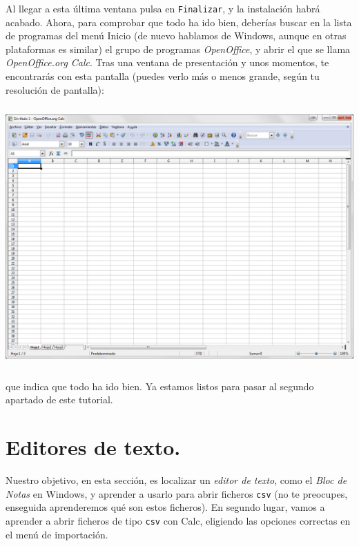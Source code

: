 \documentclass[10pt,a4paper]{article}\usepackage[]{graphicx}\usepackage[]{color}
\newcounter {cont01}
\begin{document}
Al llegar a esta última ventana pulsa en {\tt Finalizar}, y la instalación habrá acabado. Ahora,
para comprobar que todo ha ido bien, deberías buscar en la lista de programas del menú Inicio (de
nuevo hablamos de Windows, aunque en otras plataformas es similar) el grupo de programas {\em
OpenOffice}, y abrir el que se llama {\em OpenOffice.org Calc}. Tras una ventana de presentación y
unos momentos, te encontrarás con esta pantalla (puedes verlo más o menos grande, según tu
resolución de pantalla):
    \begin{center}
    \includegraphics[height=10cm]{../fig/Tut00-WebOpenOffice-10.png}
    \end{center}
que indica que todo ha ido bien. Ya estamos listos para pasar al segundo apartado de este tutorial.

\section{Editores de texto.}
\label{tut01:sec:EditoresTexto}

Nuestro objetivo, en esta sección, es localizar un {\em editor de texto}, como el {\em Bloc de
Notas} en Windows, y aprender a usarlo para abrir ficheros {\tt csv} (no te preocupes, enseguida
aprenderemos qué son estos ficheros). En segundo lugar, vamos a aprender a abrir ficheros de tipo
{\tt csv}  con Calc, eligiendo las opciones correctas en el menú de importación.
\end{document}
